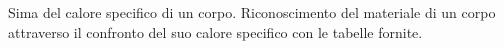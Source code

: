 Sima del calore specifico di un corpo.
Riconoscimento del materiale di un corpo attraverso il confronto del suo calore specifico con le tabelle fornite.

